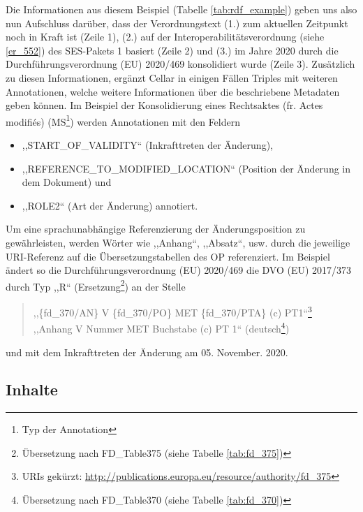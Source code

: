    \noindent
    Die Informationen aus diesem Beispiel (Tabelle \ref{tab:rdf_example}) geben uns also nun Aufschluss darüber, dass der Verordnungstext (1.) zum aktuellen Zeitpunkt noch in Kraft ist (Zeile 1), (2.) auf der Interoperabilitätsverordnung (siehe \ref{er_552}) des \ac{SES}-Pakets 1 basiert (Zeile 2) und (3.) im Jahre 2020 durch die Durchführungsverordnung (\ac{EU})  2020/469 konsolidiert wurde (Zeile 3).  
    Zusätzlich zu diesen Informationen, ergänzt Cellar in einigen Fällen Triples mit weiteren Annotationen, welche weitere Informationen über die beschriebene Metadaten geben können.
    Im Beispiel der Konsolidierung eines Rechtsaktes (fr. Actes modifiés) (MS\footnote{Typ der Annotation}) werden Annotationen mit den Feldern 
    \begin{itemize}
        \item ,,\textsf{START\_OF\_VALIDITY}`` (Inkrafttreten der Änderung),
        \item ,,\textsf{REFERENCE\_TO\_MODIFIED\_LOCATION}`` (Position der Änderung in dem Dokument) und
        \item ,,\textsf{ROLE2}`` (Art der Änderung) annotiert.
    \end{itemize}

    \noindent
    Um eine sprachunabhängige Referenzierung der Änderungsposition zu gewährleisten, werden Wörter wie ,,Anhang``, ,,Absatz``, usw. durch die jeweilige \ac{URI}-Referenz auf die Übersetzungstabellen des \ac{OP} referenziert.
    Im Beispiel ändert so die Durchführungsverordnung (\ac{EU})  2020/469 die \acs{DVO} (\ac{EU})  2017/373 durch Typ ,,R`` (Ersetzung\footnote{Übersetzung nach FD\_Table375 (siehe Tabelle \ref{tab:fd_375})}) an der Stelle 
    \begin{quote}
        \centering
        \textsf{
      ,,\{fd\_370/AN\} V 
        \{fd\_370/PO\} MET 
        \{fd\_370/PTA\} (c) PT1``\footnote{\acp{URI} gekürzt: \href{http://publications.europa.eu/resource/authority/fd_375}{http://publications.europa.eu/resource/authority/fd\_375}}\\
      ,,Anhang V Nummer MET Buchstabe (c) PT 1`` (deutsch\footnote{Übersetzung nach FD\_Table370 (siehe Tabelle \ref{tab:fd_370})})
        }
    \end{quote}
    und mit dem Inkrafttreten der Änderung am 05. November. 2020.

\subsection{Inhalte}
\label{ch:eu_content}
    
